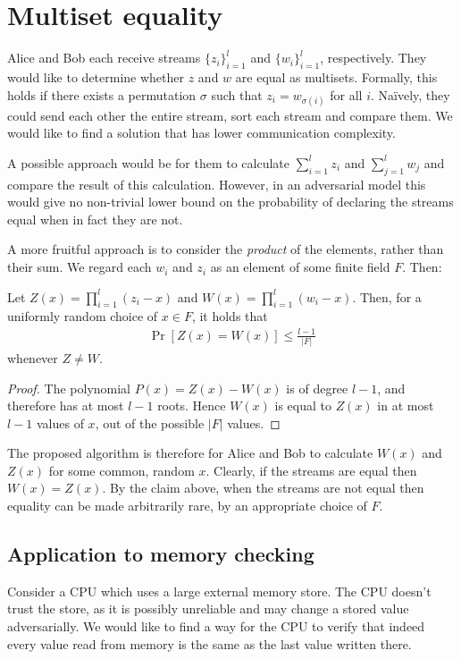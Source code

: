 \documentclass{article}
\begin{document}
\section{Multiset equality}
Alice and Bob each receive streams $\{z_i\}_{i=1}^l$ and
$\{w_i\}_{i=1}^l$, respectively. They would like to determine whether
$z$ and $w$ are equal as multisets. Formally, this holds if there
exists a permutation $\sigma$ such that $z_i=w_{\sigma(i)}$ for all
$i$. Na\"ively, they could send each other the entire stream, sort
each stream and compare them. We would like to find a solution that
has lower communication complexity.

A possible approach would be for them to calculate $\sum_{i=1}^l z_i$
and $\sum_{j=1}^l w_j$ and compare the result of this
calculation. However, in an adversarial model this would give no
non-trivial lower bound on the probability of declaring the streams
equal when in fact they are not.

A more fruitful approach is to consider the {\em product} of the
elements, rather than their sum. We regard each $w_i$ and $z_i$ as an
element of some finite field $F$. Then:
\begin{claim}
  Let $Z(x)=\prod_{i=1}^l(z_i-x)$ and $W(x)=\prod_{i=1}^l(w_i-x)$. Then, for a
  uniformly random choice of $x \in F$, it holds that
  \begin{align*}
    \Pr[Z(x)=W(x)] \leq \frac{l-1}{|F|}
  \end{align*}
  whenever $Z \neq W$.
\end{claim}
\begin{proof}
  The polynomial $P(x)=Z(x)-W(x)$ is of degree $l-1$, and therefore
  has at most $l-1$ roots. Hence $W(x)$ is equal to $Z(x)$ in at most
  $l-1$ values of $x$, out of the possible $|F|$ values.
\end{proof}

The proposed algorithm is therefore for Alice and Bob to calculate
$W(x)$ and $Z(x)$ for some common, random $x$. Clearly, if the streams
are equal then $W(x) = Z(x)$. By the claim above, when the streams are
not equal then equality can be made arbitrarily rare, by an
appropriate choice of $F$.


\subsection{Application to memory checking}

Consider a CPU which uses a large external memory store. The CPU
doesn't trust the store, as it is possibly unreliable and may change a
stored value adversarially. We would like to find a way for the CPU to
verify that indeed every value read from memory is the same as the
last value written there.
\end{document}
